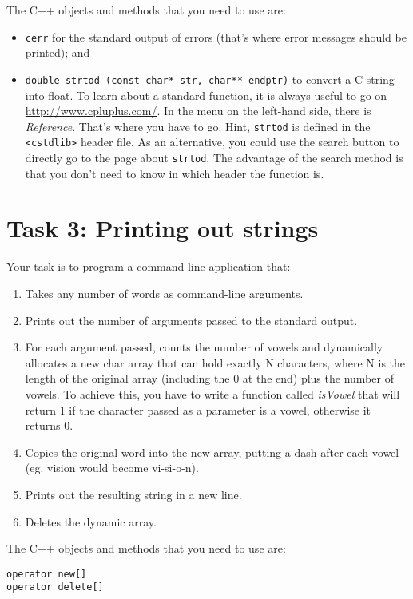 The C++ objects and methods that you need to use are:
\begin{itemize}
\item \verb+cerr+ for the standard output of errors (that's where error messages should be printed); and 
\item \verb+double strtod (const char* str, char** endptr)+ to convert a C-string into float. To learn about a standard function, it is always useful to go on \url{http://www.cpluplus.com/}. In the menu on the left-hand side, there is \emph{Reference}. That's where you have to go. Hint, \verb+strtod+ is defined in the \verb+<cstdlib>+ header file. As an alternative, you could use the search button to directly go to the page about \verb+strtod+. The advantage of the search method is that you don't need to know in which header the function is.
\end{itemize}

\section{Task 3: Printing out strings}

Your task is to program a command-line application that:
\begin{enumerate}
	\item Takes any number of words as command-line arguments.
	\item Prints out the number of arguments passed to the standard output.
	\item For each argument passed, counts the number of vowels and dynamically allocates a new char array that can hold
		  exactly N characters, where N is the length of the original array (including the 0 at the end) plus the number of vowels.
		  To achieve this, you have to write a function called \emph{isVowel} that will return 1 if the character passed as a parameter
		  is a vowel, otherwise it returns 0.
	\item Copies the original word into the new array, putting a dash after each vowel (eg. vision would become vi-si-o-n).
	\item Prints out the resulting string in a new line.
	\item Deletes the dynamic array.
\end{enumerate}

The C++ objects and methods that you need to use are:
\begin{verbatim}
operator new[]
operator delete[]
\end{verbatim}


